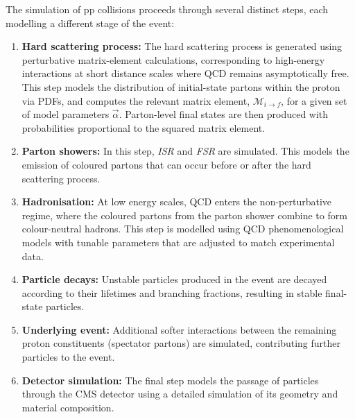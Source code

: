 The simulation of pp collisions proceeds through several distinct steps, each modelling a different stage of the event:

\begin{enumerate}
    \item \textbf{Hard scattering process:} The hard scattering process is generated using perturbative matrix-element calculations, corresponding to high-energy interactions at short distance scales where QCD remains asymptotically free. This step models the distribution of initial-state partons within the proton via \acp{PDF}, and computes the relevant matrix element, $\mathcal{M}_{i \to f}$, for a given set of model parameters $\vec{\alpha}$. Parton-level final states are then produced with probabilities proportional to the squared matrix element.

    \item \textbf{Parton showers:} In this step, \textit{\ac{ISR}} and \textit{\ac{FSR}} are simulated. This models the emission of coloured partons that can occur before or after the hard scattering process.

    \item \textbf{Hadronisation:} At low energy scales, QCD enters the non-perturbative regime, where the coloured partons from the parton shower combine to form colour-neutral hadrons. This step is modelled using QCD phenomenological models with tunable parameters that are adjusted to match experimental data.

    \item \textbf{Particle decays:} Unstable particles produced in the event are decayed according to their lifetimes and branching fractions, resulting in stable final-state particles.

    \item \textbf{Underlying event:} Additional softer interactions between the remaining proton constituents (spectator partons) are simulated, contributing further particles to the event.

    \item \textbf{Detector simulation:} The final step models the passage of particles through the \ac{CMS} detector using a detailed simulation of its geometry and material composition.
\end{enumerate}


